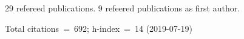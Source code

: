 29 refereed publications. 9 refeered publications as first author.

Total citations~=~692; h-index~=~14 (2019-07-19)